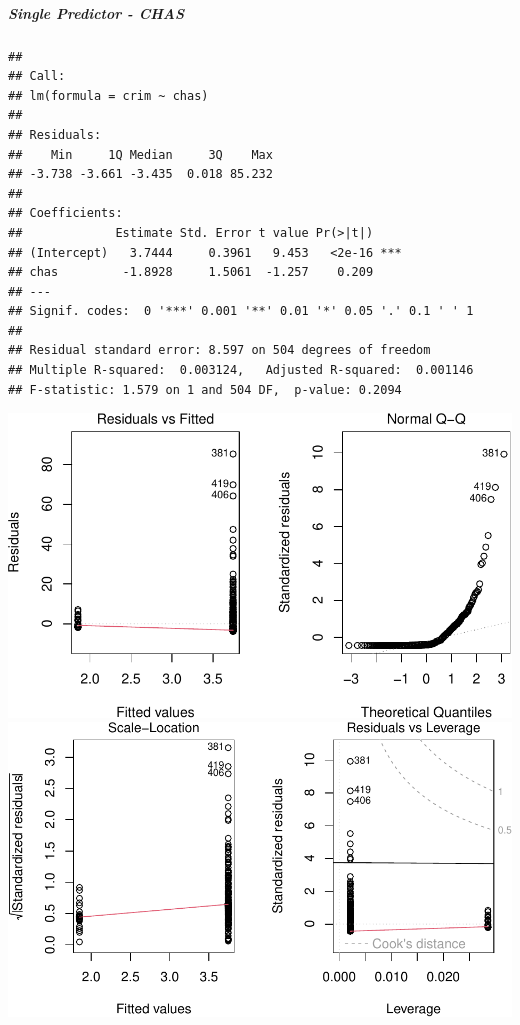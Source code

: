 \documentclass[
]{article}
\begin{document}
\hypertarget{single-predictor---chas}{%
\subparagraph{\texorpdfstring{\textbf{Single Predictor -
CHAS}}{Single Predictor - CHAS}}\label{single-predictor---chas}}

\begin{verbatim}
## 
## Call:
## lm(formula = crim ~ chas)
## 
## Residuals:
##    Min     1Q Median     3Q    Max 
## -3.738 -3.661 -3.435  0.018 85.232 
## 
## Coefficients:
##             Estimate Std. Error t value Pr(>|t|)    
## (Intercept)   3.7444     0.3961   9.453   <2e-16 ***
## chas         -1.8928     1.5061  -1.257    0.209    
## ---
## Signif. codes:  0 '***' 0.001 '**' 0.01 '*' 0.05 '.' 0.1 ' ' 1
## 
## Residual standard error: 8.597 on 504 degrees of freedom
## Multiple R-squared:  0.003124,   Adjusted R-squared:  0.001146 
## F-statistic: 1.579 on 1 and 504 DF,  p-value: 0.2094
\end{verbatim}

\includegraphics{Disha_Gandhi_Take_Home_Exam_PDF_files/figure-latex/unnamed-chunk-20-1.pdf}
\includegraphics{Disha_Gandhi_Take_Home_Exam_PDF_files/figure-latex/unnamed-chunk-20-2.pdf}
\end{document}
